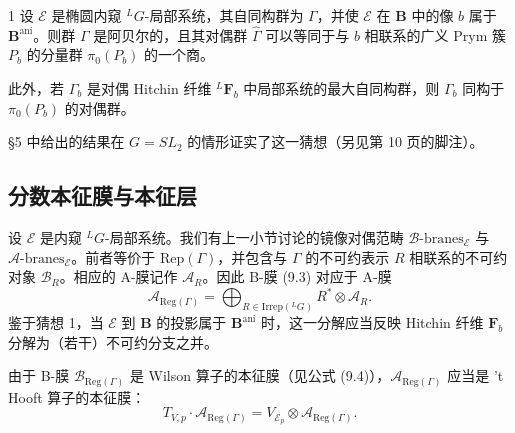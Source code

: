 \begin{namedconj}{1}
设 $\mathcal{E}$ 是椭圆内窥 ${}^{L}G$-局部系统，其自同构群为 $\Gamma$，并使 $\mathcal{E}$ 在 $\boldsymbol{B}$ 中的像 $b$ 属于 $\boldsymbol{B}^{\mathrm{ani}}$。则群 $\Gamma$ 是阿贝尔的，且其对偶群 $\widehat{\Gamma}$ 可以等同于与 $b$ 相联系的广义 Prym 簇 $P_b$ 的分量群 $\pi_0(P_b)$ 的一个商。

此外，若 $\Gamma_b$ 是对偶 Hitchin 纤维 ${}^{L}\boldsymbol{F}_b$ 中局部系统的最大自同构群，则 $\Gamma_b$ 同构于 $\pi_0(P_b)$ 的对偶群。
\end{namedconj}


§5 中给出的结果在 $G=SL_2$ 的情形证实了这一猜想（另见第 10 页的脚注）。

\subsection{分数本征膜与本征层}

设 $\mathcal{E}$ 是内窥 ${}^{L}G$-局部系统。我们有上一小节讨论的镜像对偶范畴 $\mathcal{B}\text{-branes}_{\mathcal{E}}$ 与 $\mathcal{A}\text{-branes}_{\mathcal{E}}$。前者等价于 $\mathrm{Rep}(\Gamma)$，并包含与 $\Gamma$ 的不可约表示 $R$ 相联系的不可约对象 $\mathcal{B}_R$。相应的 A-膜记作 $\mathcal{A}_R$。因此 B-膜 (9.3) 对应于 A-膜
\begin{equation}\tag{9.5}
\mathcal{A}_{\mathrm{Reg}(\Gamma)} = \bigoplus_{R\in\mathrm{Irrep}({}^{L}G)}R^*\otimes\mathcal{A}_R.
\end{equation}
鉴于猜想 1，当 $\mathcal{E}$ 到 $\boldsymbol{B}$ 的投影属于 $\boldsymbol{B}^{\mathrm{ani}}$ 时，这一分解应当反映 Hitchin 纤维 $\boldsymbol{F}_b$ 分解为（若干）不可约分支之并。

由于 B-膜 $\mathcal{B}_{\mathrm{Reg}(\Gamma)}$ 是 Wilson 算子的本征膜（见公式 (9.4)），$\mathcal{A}_{\mathrm{Reg}(\Gamma)}$ 应当是 't Hooft 算子的本征膜：
\begin{equation}\tag{9.6}
T_{V,p}\cdot\mathcal{A}_{\mathrm{Reg}(\Gamma)} = V_{\mathcal{E}_p}\otimes\mathcal{A}_{\mathrm{Reg}(\Gamma)}.
\end{equation}

